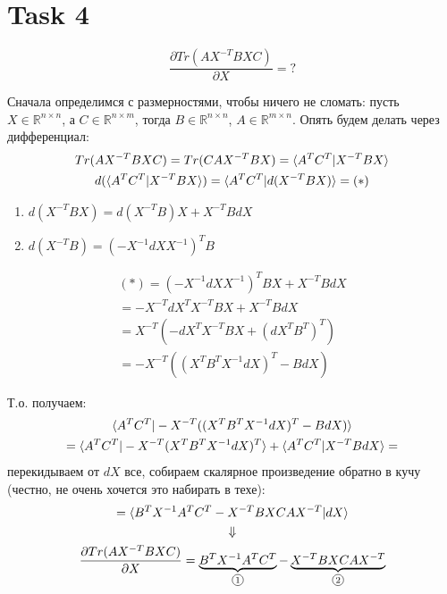 
\section{Task 4}
\begin{task}
    \begin{equation}
        \frac{\partial Tr(AX^{-T}BXC)}{\partial X} = ?
    \end{equation}
\end{task}


\begin{solution}
    Сначала определимся с размерностями, чтобы ничего не сломать: пусть $X \in \mathbb{R}^{n \times n}$, а $C \in \mathbb{R}^{n \times m}$, тогда $B \in \mathbb{R}^{n \times n}$, $A \in \mathbb{R}^{m \times n}$. Опять будем делать через дифференциал:
    \begin{gather}
        Tr(AX^{-T}BXC) = Tr(CAX^{-T}BX) = \braket{A^TC^T | X^{-T}BX} \\
        d(\braket{A^TC^T | X^{-T}BX}) = \braket{A^TC^T | d(X^{-T}BX)} = (*)
    \end{gather}
    \begin{enumerate}
        \item $d(X^{-T}BX) = d(X^{-T}B)X + X^{-T}BdX$
        \item $d(X^{-T} B) = (-X^{-1} dX X^{-1})^T B$
    \end{enumerate}
    \begin{gather}
        (*) = (-X^{-1} dX X^{-1})^T B X + X^{-T} B dX \\
        = -X^{-T} dX^T X^{-T} B X + X^{-T} B dX \\
        = X^{-T} (-dX^T X^{-T} B X + (dX^T B^T)^T) \\
        = -X^{-T}((X^T B^T X^{-1} dX)^T - B dX)
    \end{gather}

    Т.о. получаем:
    \begin{gather}
        \braket{A^T C^T | -X^{-T}((X^T B^T X^{-1} dX)^T - B dX)} \\
        = \braket{A^T C^T | -X^{-T} (X^T B^T X^{-1} dX)^T} + \braket{A^T C^T | X^{-T} B dX} =
    \end{gather}
    перекидываем от $dX$ все, собираем скалярное произведение обратно в кучу (честно, не очень хочется это набирать в техе):
    \begin{gather}
        = \braket{B^T X^{-1} A^T C^T - X^{-T} B X C A X^{-T} | dX} \\
        \Downarrow \\
        \frac{\partial Tr(AX^{-T}BXC)}{\partial X} = \underbrace{B^T X^{-1} A^T C^T}_{\mathcircled{1}} - \underbrace{X^{-T} B X C A X^{-T}}_{\mathcircled{2}}
    \end{gather}


\end{solution}
